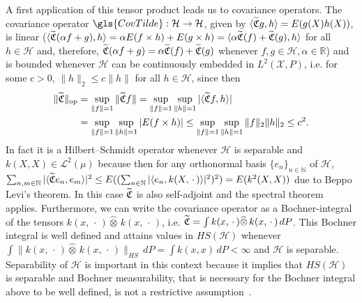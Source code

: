\documentclass[10pt]{amsart}
\theoremstyle{definition}\newtheorem{defi}[theo]{Definition}\newtheorem{rema}[theo]{Remark}\newtheorem{exam}[theo]{Example}\newtheorem{exem}[theo]{Example}\newtheorem{nota}[theo]{Notation}
\theoremstyle{remark}
\DeclareMathOperator{\opp}{op}
\newcommand{\R}{\mathbb{R}}
\newcommand{\bbN}{\mathbb{N}}
\newcommand{\X}{\mathcal{X}}
\newcommand{\cH}{\mathcal{H}}
\newcommand{\clL}{\mathcal{L}}
\newcommand{\fkC}{\mathfrak{C}}
\newcommand{\Cov}{\tilde{\fkC}}
\let\oldtilde\tilde
\renewcommand*{\tilde}[1]{\mathchoice{\widetilde{#1}}{\widetilde{#1}}{\oldtilde{#1}}{\oldtilde{#1}}}
\renewcommand*{\to}{\mathchoice{\longrightarrow}{\rightarrow}{\rightarrow}{\rightarrow}}
\begin{document}
A first application of this tensor product leads us to covariance operators. The covariance operator $\gls{CovTilde} : \cH \to \cH$, given by $\langle \Cov g, h \rangle = E(g(X)h(X))$, is linear ($\langle \Cov(\alpha f+g), h \rangle = \alpha E(f \times h) + E(g \times h)=
\langle \alpha \Cov(f) + \Cov(g), h \rangle$ for all $h\in \cH$ and, therefore, $\Cov(\alpha f+g) = \alpha \Cov(f) + \Cov(g)$ whenever $f,g \in \cH, \alpha \in \R$) and is bounded whenever $\cH$ can be continuously embedded in $L^2(\X,P)$, i.e. for some $c>0$, $\|h\|_2 \leq c \|h\|$ for all $h\in\cH$, since then
\begin{align*}
\| \Cov \|_{\opp} &= \sup_{\|f\| = 1} \|\Cov f\| = \sup_{\|f\| = 1} \sup_{\|h\|=1} |\langle \Cov f,h \rangle| \\
&= \sup_{\|f\| = 1} \sup_{\|h\|=1} |E(f \times h)| \leq \sup_{\|f\| = 1} \sup_{\|h\|=1} \|f\|_2 \|h\|_2 \leq c^2.
\end{align*}
In fact it is a Hilbert--Schmidt operator whenever $\cH$ is separable and $k(X,X) \in \clL^2(\mu)$ because then for any orthonormal basis $\{e_n\}_{n\in \bbN}$ of $\cH$, $\sum_{n,m \in\bbN} |\langle \tilde{\fkC}e_n,e_m \rangle |^2
\leq E((\sum_{n\in\bbN} |\langle e_n, k(X,\,\cdot\,) \rangle|^2)^2) = E(k^2(X,X))$ due to Beppo Levi's theorem. In this case $\tilde{\fkC}$ is also self-adjoint and the spectral theorem applies. Furthermore, we can write the covariance operator as a Bochner-integral of the tensors $k(x,\,\cdot\,) \widehat \otimes \, k(x,\,\cdot\,)$, i.e. $\tilde{\fkC} = \int k(x,\,\cdot\,) \widehat \otimes \, k(x,\,\cdot\,) \, dP$. This Bochner integral is well defined and attains values in $HS(\cH)$ whenever $\int \|k(x,\,\cdot\,) \widehat \otimes \, k(x,\,\cdot\,) \|_{HS} \, dP = \int k(x,x) \, dP < \infty$ and $\cH$ is separable. Separability of $\cH$ is important in this context because it implies that $HS(\cH)$ is separable and Bochner measurability, that is necessary for the Bochner integral above to be well defined, is not a restrictive assumption~\cite[Appendix~B12]{DEF92}.
\end{document}
